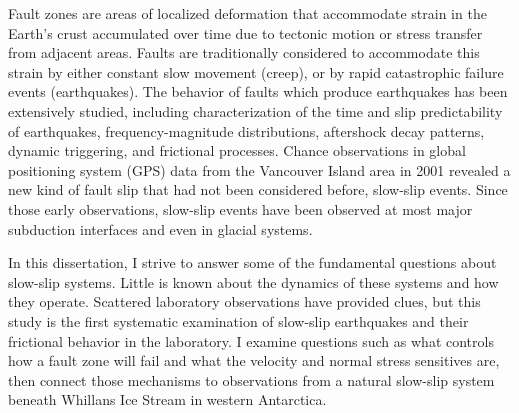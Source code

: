 \documentclass[11pt]{psuthesis}
\begin{document}
\begin{frontmatter}


\begin{doublespace}
\titlepage
\end{doublespace}

\committeepage

\abstract

Fault zones are areas of localized deformation that accommodate strain in the Earth's crust accumulated over time due to tectonic motion or stress transfer from adjacent areas. Faults are traditionally considered to accommodate this strain by either constant slow movement (creep), or by rapid catastrophic failure events (earthquakes). The behavior of faults which produce earthquakes has been extensively studied, including characterization of the time and slip predictability of earthquakes, frequency-magnitude distributions, aftershock decay patterns, dynamic triggering, and frictional processes. Chance observations in global positioning system (GPS) data from the Vancouver Island area in 2001 revealed a new kind of fault slip that had not been considered before, slow-slip events. Since those early observations, slow-slip events have been observed at most major subduction interfaces and even in glacial systems. 

In this dissertation, I strive to answer some of the fundamental questions about slow-slip systems. Little is known about the dynamics of these systems and how they operate. Scattered laboratory observations have provided clues, but this study is the first systematic examination of slow-slip earthquakes and their frictional behavior in the laboratory. I examine questions such as what controls how a fault zone will fail and what the velocity and normal stress sensitives are, then connect those mechanisms to observations from a natural slow-slip system beneath Whillans Ice Stream in western Antarctica.


\end{frontmatter}
\end{document}

